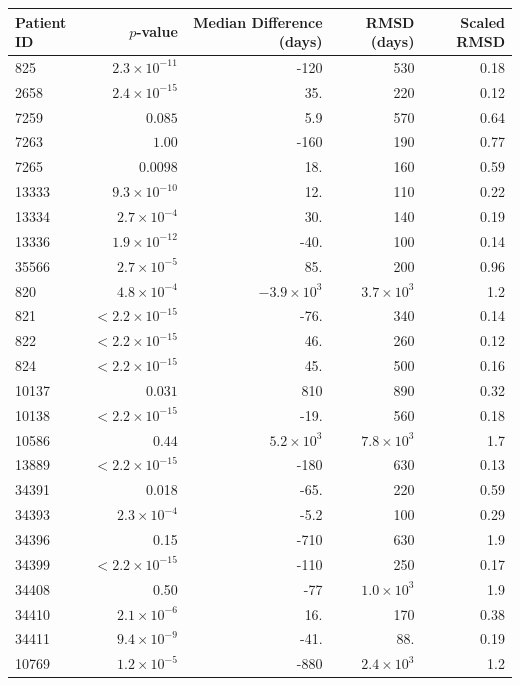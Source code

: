 \documentclass[12pt]{article}
\newcommand{\badpat}[1]{\rowcolor{badpatcol}#1}
\begin{document}
\begin{table}[!ht]
\def\arraystretch{1.3}%
\begin{center}
\begin{tabular}{lrrrr} 
Patient ID & $p$-value & Median Difference (days) & RMSD (days) & Scaled RMSD \\ 
\hline
825 & $2.3 \times 10^{-11}$ & -120 & 530 & 0.18 \\
2658 & $2.4 \times 10^{-15}$  & 35. & 220 & 0.12 \\
\badpat{7259 & $0.085$ & 5.9 & 570 & 0.64} \\
\badpat{7263 & $1.00$ & -160 & 190 & 0.77} \\
7265 & $0.0098$ & 18. & 160 & 0.59 \\
13333 & $9.3 \times 10^{-10}$ & 12. & 110 & 0.22 \\
13334 & $2.7 \times 10^{-4}$ & 30. & 140 & 0.19 \\
13336 & $1.9 \times 10^{-12}$ & -40. & 100 & 0.14 \\
35566 & $2.7 \times 10^{-5}$ & 85. & 200 & 0.96 \\
\hline
820 & $4.8 \times 10^{-4}$ & $-3.9 \times 10^{3}$ & $3.7 \times 10^{3}$ & 1.2 \\
821 & $< 2.2 \times 10^{-15}$ & -76. & 340 & 0.14 \\
822 & $< 2.2 \times 10^{-15}$ & 46. & 260 & 0.12 \\
824 & $< 2.2 \times 10^{-15}$ & 45. & 500 & 0.16 \\
\badpat{10137 & $0.031$ & 810 & 890 & 0.32} \\
10138 & $< 2.2 \times 10^{-15}$ & -19. & 560 & 0.18 \\
\badpat{10586 & $0.44$ & $5.2 \times 10^3$ & $7.8 \times 10^{3}$ & 1.7} \\
13889 & $< 2.2 \times 10^{-15}$ & -180 & 630 & 0.13 \\
\badpat{34391 & 0.018 & -65. & 220 & 0.59} \\
34393 & $2.3 \times 10^{-4}$ & -5.2 & 100 & 0.29 \\
\badpat{34396 & 0.15 & -710 & 630 & 1.9} \\
34399 & $< 2.2 \times 10^{-15}$ & -110 & 250 & 0.17 \\
\badpat{34408 & 0.50 & -77 & $1.0 \times 10^{3}$ & 1.9} \\
34410 & $2.1 \times 10^{-6}$ & 16. & 170 & 0.38 \\
34411 & $9.4 \times 10^{-9}$ & -41. & 88. & 0.19 \\
10769 & $1.2 \times 10^{-5}$ & -880 & $2.4 \times 10^3$ & 1.2 \\

\end{tabular}
\end{center}
\end{table}
\end{document}
